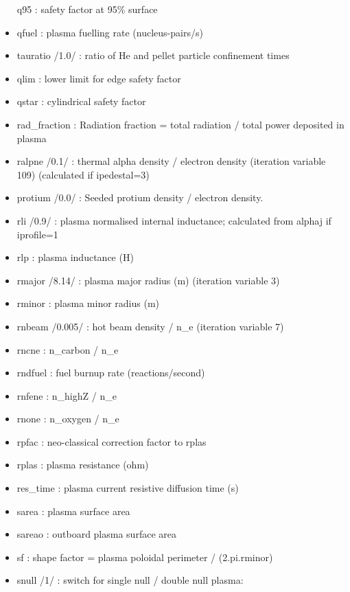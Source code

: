 \documentclass[]{article}
\begin{document}
\begin{itemize}
  q95 : safety factor at 95\% surface
\item
  qfuel : plasma fuelling rate (nucleus-pairs/s)
\item
  tauratio /1.0/ : ratio of He and pellet particle confinement times
\item
  qlim : lower limit for edge safety factor
\item
  qstar : cylindrical safety factor
\item
  rad\_fraction : Radiation fraction = total radiation / total power
  deposited in plasma
\item
  ralpne /0.1/ : thermal alpha density / electron density (iteration
  variable 109) (calculated if ipedestal=3)
\item
  protium /0.0/ : Seeded protium density / electron density.
\item
  rli /0.9/ : plasma normalised internal inductance; calculated from
  alphaj if iprofile=1
\item
  rlp : plasma inductance (H)
\item
  rmajor /8.14/ : plasma major radius (m) (iteration variable 3)
\item
  rminor : plasma minor radius (m)
\item
  rnbeam /0.005/ : hot beam density / n\_e (iteration variable 7)
\item
  rncne : n\_carbon / n\_e
\item
  rndfuel : fuel burnup rate (reactions/second)
\item
  rnfene : n\_highZ / n\_e
\item
  rnone : n\_oxygen / n\_e
\item
  rpfac : neo-classical correction factor to rplas
\item
  rplas : plasma resistance (ohm)
\item
  res\_time : plasma current resistive diffusion time (s)
\item
  sarea : plasma surface area
\item
  sareao : outboard plasma surface area
\item
  sf : shape factor = plasma poloidal perimeter / (2.pi.rminor)
\item
  snull /1/ : switch for single null / double null plasma:


\end{itemize}
\end{document}
